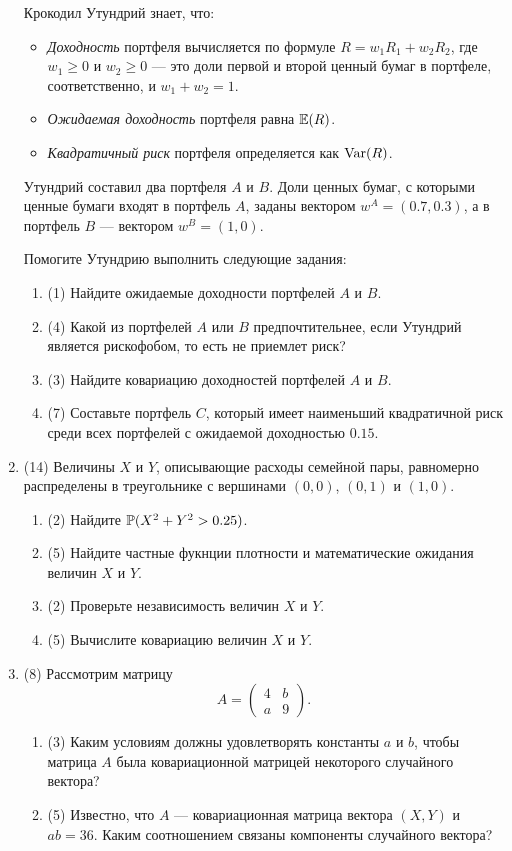 \begin{enumerate}
	Крокодил Утундрий знает, что: 
	\begin{itemize}
	\item \textit{Доходность} портфеля вычисляется по формуле $R=w_1 R_1+w_2 R_2$, где $w_1 \geq 0$ и $w_2 \geq 0$ — это доли первой и второй ценный бумаг в портфеле, соответственно, и $w_1 + w_2 = 1$.
	\item \textit{Ожидаемая доходность} портфеля равна $\E(R)$.
	\item \textit{Квадратичный риск} портфеля определяется как $\Var(R)$.
	\end{itemize}

	Утундрий составил два портфеля $A$ и $B$. 
	Доли ценных бумаг, с которыми ценные бумаги входят в портфель $A$, заданы вектором $w^{A}=(0.7, 0.3)$, 
	а в портфель $B$ — вектором $w^{B} = (1, 0)$. 
	
	Помогите Утундрию выполнить следующие задания:
	 \begin{enumerate}
	\item (1) Найдите ожидаемые доходности портфелей $A$ и $B$.
	\item (4) Какой из портфелей $A$ или $B$ предпочтительнее, если Утундрий является рискофобом, то есть не приемлет риск?
	\item (3) Найдите ковариацию доходностей портфелей $A$ и $B$.
	\item (7) Составьте портфель $C$, который имеет наименьший квадратичной риск среди всех портфелей с ожидаемой доходностью $0.15$.
	\end{enumerate}
	
	
	\item (14) Величины $X$ и $Y$, описывающие расходы семейной пары, 
	равномерно распределены в треугольнике с вершинами $(0,0)$, $(0,1)$ и $(1,0)$.
	 \begin{enumerate}
	\item (2) Найдите $\P(X^2 + Y^2 > 0.25)$.
	\item (5) Найдите частные фукнции плотности и математические ожидания величин $X$ и $Y$.
	\item (2) Проверьте независимость величин $X$ и $Y$.
	\item (5) Вычислите ковариацию величин $X$ и $Y$.
	\end{enumerate}
	
	\item (8) Рассмотрим матрицу
	 \[
	A = \begin{pmatrix}
	 4 & b \\
	 a & 9
	\end{pmatrix}.
	\]
	 \begin{enumerate}
	\item (3) Каким условиям должны удовлетворять константы $a$ и $b$, 
	чтобы матрица $A$ была ковариационной матрицей некоторого случайного вектора?
	\item  (5) Известно, что $A$ — ковариационная матрица вектора $(X, Y)$ и $ab =36$. 
	Каким соотношением связаны компоненты случайного вектора?
	\end{enumerate}
	

\end{enumerate}
